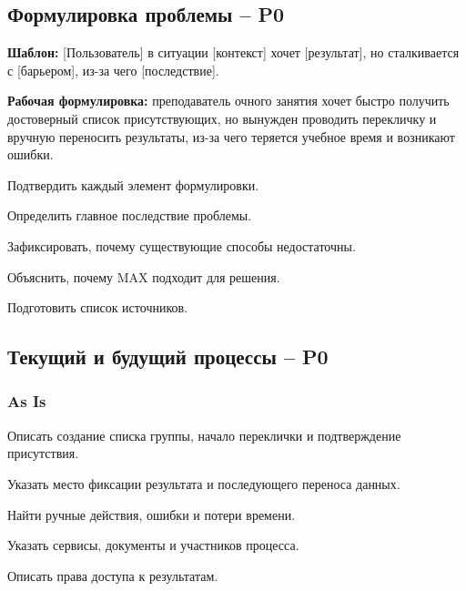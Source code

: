 \documentclass[11pt,a4paper]{article}
\newcommand{\PZero}{\textcolor{PZero}{\textbf{P0}}}
\begin{document}
\subsection{Формулировка проблемы -- \PZero}
\begin{summarybox}
\textbf{Шаблон:} [Пользователь] в ситуации [контекст] хочет [результат], но сталкивается с [барьером], из-за чего [последствие].

\medskip
\textbf{Рабочая формулировка:} преподаватель очного занятия хочет быстро получить достоверный список присутствующих, но вынужден проводить перекличку и вручную переносить результаты, из-за чего теряется учебное время и возникают ошибки.
\end{summarybox}
\begin{tasklist}
  \item Подтвердить каждый элемент формулировки.
  \item Определить главное последствие проблемы.
  \item Зафиксировать, почему существующие способы недостаточны.
  \item Объяснить, почему MAX подходит для решения.
  \item Подготовить список источников.
\end{tasklist}

\subsection{Текущий и будущий процессы -- \PZero}
\subsubsection{As Is}
\begin{tasklist}
  \item Описать создание списка группы, начало переклички и подтверждение присутствия.
  \item Указать место фиксации результата и последующего переноса данных.
  \item Найти ручные действия, ошибки и потери времени.
  \item Указать сервисы, документы и участников процесса.
  \item Описать права доступа к результатам.
\end{tasklist}
\end{document}
